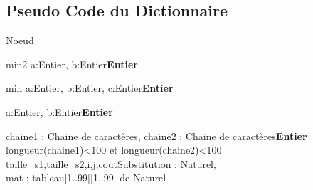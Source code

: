 \subsection{Pseudo Code du Dictionnaire}
    
    \begin{algorithme}    
        \begin{enregistrement}{Noeud}
        \end{enregistrement}
    \end{algorithme}
    
    
    \begin{algorithme}
	\fonction
	{min2}
	{a:Entier, b:Entier}{\textbf{Entier}}
	{}
	{
	{}
	}\\
    \end{algorithme}

    \begin{algorithme}
        \fonction
        {min}
        {a:Entier, b:Entier, c:Entier}{\textbf{Entier}}
        {}
        {}\\
    \end{algorithme}
    
    \begin{algorithme}
        {a:Entier, b:Entier}{\textbf{Entier}}
        {}
        {
        {}}\\
    \end{algorithme}
    
    \begin{algorithme}
        {chaine1 : Chaine de caractères, chaine2 : Chaine de caractères}{\textbf{Entier}}
        {longueur(chaine1)<100 et longueur(chaine2)<100}
        {taille\_s1,taille\_s2,i,j,coutSubstitution : Naturel,\\ 
        mat : tableau[1..99][1..99] de Naturel}
        {{}
        {}
        {
        }
        {
        }
        {
        }
        {
        }
        {}
        }\\
    \end{algorithme}
    
